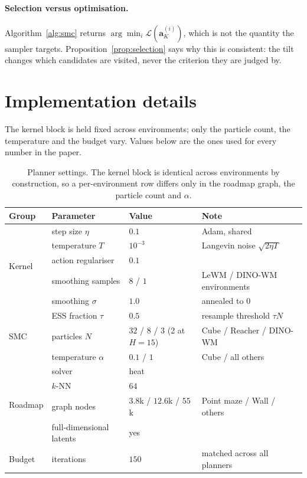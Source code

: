 \paragraph{Selection versus optimisation.} Algorithm~\ref{alg:smc} returns
$\arg\min_i \mathcal{L}(\mathbf{a}_K^{(i)})$, which is not the quantity the
sampler targets. Proposition~\ref{prop:selection} says why this is consistent:
the tilt changes which candidates are visited, never the criterion they are
judged by.

\section{Implementation details}
\label{app:impl}

The kernel block is held fixed across environments; only the particle count, the
temperature and the budget vary. Values below are the ones used for every number
in the paper.

\begin{table}[h]
  \caption{Planner settings. The kernel block is identical across environments
  by construction, so a per-environment row differs only in the roadmap graph,
  the particle count and $\alpha$.}
  \label{tab:hyper}
  \centering
  \setlength{\tabcolsep}{7pt}
  \begin{tabular}{llll}
    \toprule
    Group & Parameter & Value & Note \\
    \midrule
    \multirow{5}{*}{Kernel}
      & step size $\eta$            & $0.1$      & Adam, shared \\
      & temperature $T$             & $10^{-3}$  & Langevin noise $\sqrt{2\eta T}$ \\
      & action regulariser          & $0.1$      & \\
      & smoothing samples           & $8$ / $1$  & LeWM / DINO-WM environments \\
      & smoothing $\sigma$          & $1.0$      & annealed to $0$ \\
    \midrule
    \multirow{3}{*}{SMC}
      & ESS fraction $\tau$         & $0.5$      & resample threshold $\tau N$ \\
      & particles $N$               & $32$ / $8$ / $3$ (2 at $H{=}15$)
                                                 & Cube / Reacher / DINO-WM \\
      & temperature $\alpha$        & $0.1$ / $1$ & Cube / all others \\
    \midrule
    \multirow{4}{*}{Roadmap}
      & solver                      & heat       & \\
      & $k$-NN                      & $64$       & \\
      & graph nodes                 & $3.8$k / $12.6$k / $55$k
                                                 & Point maze / Wall / others \\
      & full-dimensional latents    & yes        & \\
    \midrule
    Budget & iterations             & $150$      & matched across all planners \\
    \bottomrule
  \end{tabular}
\end{table}

